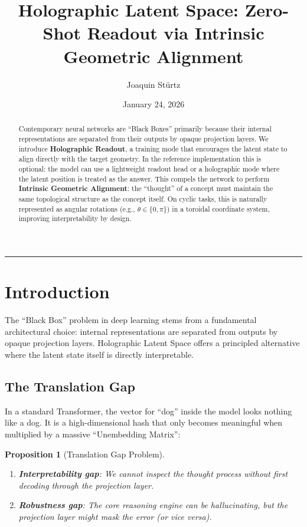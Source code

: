 \documentclass[12pt,letterpaper,twoside]{article}
\title{\textbf{Holographic Latent Space: Zero-Shot Readout via Intrinsic Geometric Alignment}}
\author{Joaquin Stürtz}
\date{January 24, 2026}
\newtheorem{prop}{Proposition}[section]
\begin{document}
\maketitle
\thispagestyle{empty}

\vspace{0.5cm}

\begin{abstract}
Contemporary neural networks are ``Black Boxes'' primarily because their internal representations are separated from their outputs by opaque projection layers. We introduce \textbf{Holographic Readout}, a training mode that encourages the latent state to align directly with the target geometry. In the reference implementation this is optional: the model can use a lightweight readout head or a holographic mode where the latent position is treated as the answer. This compels the network to perform \textbf{Intrinsic Geometric Alignment}: the ``thought'' of a concept must maintain the same topological structure as the concept itself. On cyclic tasks, this is naturally represented as angular rotations (e.g., $\theta \in \{0, \pi\}$) in a toroidal coordinate system, improving interpretability by design.
\end{abstract}

\vspace{0.5cm}
\hrule
\vspace{0.5cm}

\tableofcontents
\newpage

\section{Introduction}

The ``Black Box'' problem in deep learning stems from a fundamental architectural choice: internal representations are separated from outputs by opaque projection layers. Holographic Latent Space offers a principled alternative where the latent state itself is directly interpretable.

\subsection{The Translation Gap}

In a standard Transformer, the vector for ``dog'' inside the model looks nothing like a dog. It is a high-dimensional hash that only becomes meaningful when multiplied by a massive ``Unembedding Matrix'':

\begin{prop}[Translation Gap Problem]
\begin{enumerate}
\item \textbf{Interpretability gap}: We cannot inspect the thought process without first decoding through the projection layer.
\item \textbf{Robustness gap}: The core reasoning engine can be hallucinating, but the projection layer might mask the error (or vice versa).
\end{enumerate}
\end{prop}
\end{document}

